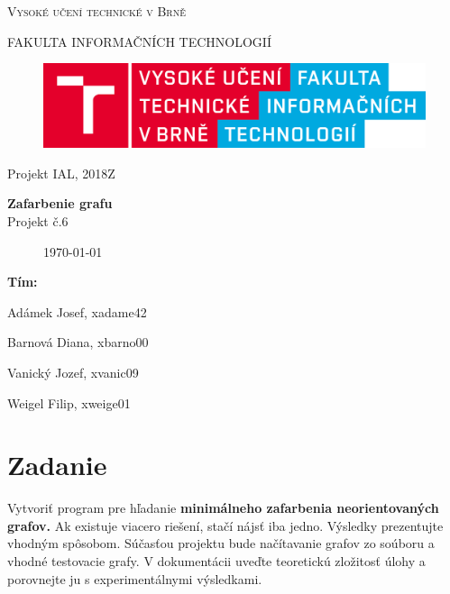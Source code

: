 \documentclass[a4paper,11pt]{article}
\begin{document}

\begin{titlepage}
\begin{center}
    {\Huge \textsc{Vysoké učení technické v Brně}}
    
    {\LARGE \uppercase{FAKULTA INFORMAČNÍCH TECHNOLOGIÍ}}
    
\begin{figure}[h]
\vspace{5.0cm}
\centering
\includegraphics[scale=0.15]{logo.png}
\vspace{-10.0cm}
\end{figure}
    
	{\LARGE Projekt IAL, 2018Z}

	{\Huge \textbf{Zafarbenie grafu}}
\\

{\LARGE {Projekt č.6}}\\

\begin{figure}[h]
\centering
{\Large {\mydate\today}}
\vspace{6cm}
\end{figure}

\end{center}
\begin{compactitem}
\item[] \textbf{Tím:}
\item[] Adámek Josef, xadame42
\item[] Barnová Diana, xbarno00
\item[] Vanický Jozef, xvanic09
\item[] Weigel Filip, xweige01
\end{compactitem}

\end{titlepage}

\tableofcontents
\newpage

\section{Zadanie}
Vytvoriť program pre hľadanie \textbf{minimálneho zafarbenia neorientovaných grafov.} 
Ak existuje viacero riešení, stačí nájsť iba jedno. Výsledky prezentujte vhodným spôsobom. Súčasťou projektu bude načítavanie grafov zo soúboru a vhodné testovacie grafy. V dokumentácii uveďte teoretickú zložitosť úlohy a porovnejte ju s experimentálnymi výsledkami.
\end{document}
